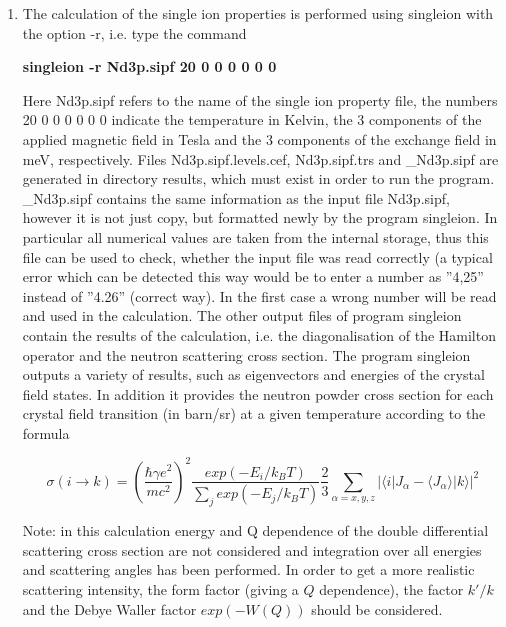 \begin{enumerate} 
\item
The calculation of the single ion properties is 
performed using {\prg singleion} with the option {\prg -r}, 
i.e. type the command 

{\bf singleion -r Nd3p.sipf 20 0 0 0  0 0 0} 

Here Nd3p.sipf refers to the name of the single ion property file, the numbers 20 0 0 0  0 0 0 indicate the
temperature in Kelvin, the 3 components of the applied magnetic field in Tesla and the 3 components
of the exchange field in meV, respectively.
Files {\prg Nd3p.sipf.levels.cef, Nd3p.sipf.trs} and {\prg \_Nd3p.sipf}
 are generated in directory {\prg results}, which must exist in order to run the program.
{\prg \_Nd3p.sipf} contains the same information as the input file {\prg Nd3p.sipf}, however
it is not just  copy, but formatted newly by the program {\prg singleion}. In particular
 all numerical values are taken from the internal storage, thus this file can be used to
check, whether the input file was read correctly (a typical error which can be detected
this way would be to enter a number as ''4,25''  instead of ''4.26'' (correct way). In the
first case a wrong number will be read and used in the calculation.
The other output files of program {\prg singleion} contain the results of the calculation, i.e.
the diagonalisation of the Hamilton operator and the neutron scattering cross section.
The program {\prg singleion} outputs a variety of results, such as eigenvectors and 
energies of the crystal field states. In addition it provides 
the neutron powder cross section for each crystal field
transition (in barn/sr) at a given temperature according to the formula

\begin{equation}
\sigma(i\rightarrow k)=\left(\frac{\hbar \gamma e^2}{mc^2}\right)^2
\frac{exp(-E_i/k_BT)}{\sum_j exp(-E_j/k_BT)} \frac{2}{3}\sum_{\alpha=x,y,z}
|\langle i|J_{\alpha}-\langle J_{\alpha} \rangle |k\rangle|^2
\end{equation}

Note: in this calculation energy and Q dependence
of the double differential scattering cross section are not considered and
integration over all energies and scattering angles has been performed.
In order to get a more realistic scattering intensity, the
form factor (giving a $Q$ dependence), the
factor $k'/k$ and the Debye Waller factor $exp(-W(Q))$ should be considered.


\end{enumerate}
